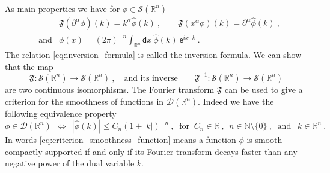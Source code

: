 \documentclass[11pt]{book}
\newcommand{\abs}[1]{\left|#1\right|}
\newcommand{\Dcal}{\mathcal{D}}
\newcommand{\Scal}{\mathcal{S}}
\newcommand{\Nbb}{\mathbb{N}}
\newcommand{\Rbb}{\mathbb{R}}
\newcommand{\Frak}{\mathfrak{F}}
\newcommand{\dsf}{\mathsf{d}}
\newcommand{\esf}{\mathsf{e}}
\theoremstyle{break}
\begin{document}
As main properties we have for $\phi \in \Scal(\Rbb^n)$ 
%
\begin{eqnarray}
&& \Frak(\partial^\alpha \phi)(k) = k^\alpha \hat{\phi}(k) \ , \qquad \Frak(x^\alpha \phi)(k) = \partial^\alpha \hat{\phi}(k) \ , \nonumber \\[6pt]
&\mbox{and}& \phi(x) = (2\pi)^{-n} \int_{\Rbb^n} \dsf x \ \hat{\phi}(k) \ \esf^{i x \cdot k} \ .
\label{eq:inversion_formula}
\end{eqnarray}
%
The relation \eqref{eq:inversion_formula} is called the inversion formula. We can show that the map
%
\begin{equation*}
\Frak : \Scal(\Rbb^n) \to \Scal(\Rbb^n) \ , \quad \mbox{and its inverse} \qquad \Frak^{-1} : \Scal(\Rbb^n) \to \Scal(\Rbb^n)
\end{equation*}
%
are two continuous isomorphisms. The Fourier transform $\Frak$ can be used to give a criterion for the smoothness of functions in $\Dcal(\Rbb^n)$. Indeed we have the following equivalence property
%
\begin{equation}
\phi \in \Dcal(\Rbb^n) \ \  \Longleftrightarrow  \ \ \abs{\hat{\phi}(k)} \leq C_n (1+\abs{k})^{-n} \ , \ \mbox{ for } \  C_n \in \Rbb \ , \ \ n \in \Nbb \setminus \{0\} \ , \ \mbox{ and } \ \ k \in \Rbb^n \ .
\label{eq:criterion_smoothness_function}
\end{equation}
%
In words \eqref{eq:criterion_smoothness_function} means a function $\phi$ is smooth compactly supported if and only if its Fourier transform decays faster than any negative power of the dual variable $k$.
\end{document}
